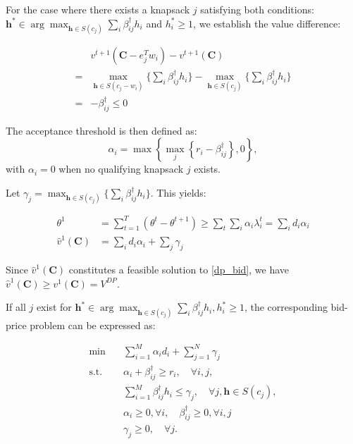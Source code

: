 For the case where there exists a knapsack $j$ satisfying both conditions: $\bm{h}^{*} \in \arg\max_{\bm{h} \in S(c_j)} \sum_{i} \beta_{ij}^{\dag} h_{i}$ and $h_{i}^{*} \geq 1$, we establish the value difference: 

\begin{align*}
    & v^{t+1}(\bm{C} - e_{j}^{T} w_{i}) - v^{t+1}(\bm{C}) \\ 
  = & \max_{\bm{h} \in S(c_{j}- w_{i})} \{\sum_{i} \beta_{ij}^{\dag} h_{i}\} - \max_{\bm{h} \in S(c_{j})} \{\sum_{i} \beta_{ij}^{\dag} h_{i}\} \\
  = & -\beta_{ij}^{\dag} \leq 0
\end{align*}

The acceptance threshold is then defined as:
$$\alpha_{i} = \max\left\{\max_{j}\left\{r_i - \beta_{ij}^{\dag} \right\}, 0\right\},$$ 
with $\alpha_{i} = 0$ when no qualifying knapsack $j$ exists.

Let $\gamma_{j} = \max_{\bm{h} \in S(c_{j})} \{\sum_{i} \beta_{ij}^{\dag} h_{i}\}$. This yields:

\begin{align*}
    \theta^{1} & = \sum_{t=1}^{T} (\theta^{t} - \theta^{t+1}) \geq \sum_{t} \sum_{i} \alpha_{i} \lambda_{i}^{t} = \sum_{i} d_{i} \alpha_{i} \\
    \hat{v}^{1}(\bm{C}) & = \sum_{i} d_{i} \alpha_{i} + \sum_{j} \gamma_{j}
\end{align*}

Since $\hat{v}^{1}(\bm{C})$ constitutes a feasible solution to \eqref{dp_bid}, we have $\hat{v}^{1}(\bm{C}) \geq v^{1}(\bm{C}) =  V^{DP}$.

If all $j$ exist for $\bm{h}^{*} \in \arg\max_{\bm{h} \in S(c_j)} \sum_{i} \beta_{ij}^{\dag} h_{i}, h_{i}^{*} \geq 1$, the corresponding bid-price problem can be expressed as:

\begin{equation}\label{improve_bid}
    \begin{aligned}
    \min \quad & \sum_{i=1}^M \alpha_i d_i+ \sum_{j=1}^N \gamma_j \\
    \mathrm{s.t.} \quad & \alpha_i+ \beta_{ij}^{\dag} \geq r_i, \quad \forall i, j, \\
    & \sum_{i=1}^M \beta_{ij}^{\dag} h_i \leq \gamma_j, \quad \forall j, \bm{h} \in S(c_j), \\
    & \alpha_i \geq 0, \forall i, \quad \beta_{ij}^{\dag} \geq 0, \forall i, j \\
    & \gamma_j \geq 0, \quad \forall j.
    \end{aligned}
\end{equation}

